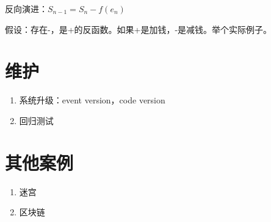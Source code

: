 反向演进：$S_{n-1} = S_n - f(e_n)$

假设：存在-，是+的反函数。如果+是加钱，-是减钱。举个实际例子。

\section{维护}
\begin{enumerate}
    \item 系统升级：event version，code version
    \item 回归测试
\end{enumerate}

\section{其他案例}
\begin{enumerate}
    \item 迷宫
    \item 区块链
\end{enumerate}




